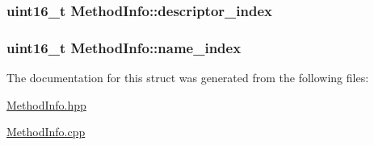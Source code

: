 \subsubsection[{\texorpdfstring{descriptor\+\_\+index}{descriptor_index}}]{\setlength{\rightskip}{0pt plus 5cm}uint16\+\_\+t Method\+Info\+::descriptor\+\_\+index}\hypertarget{struct_method_info_a427ffc223f3b52b4d83fa6ee9e411089}{}\label{struct_method_info_a427ffc223f3b52b4d83fa6ee9e411089}
\subsubsection[{\texorpdfstring{name\+\_\+index}{name_index}}]{\setlength{\rightskip}{0pt plus 5cm}uint16\+\_\+t Method\+Info\+::name\+\_\+index}\hypertarget{struct_method_info_afaa8591bae9244b2b47609e4919e4dbe}{}\label{struct_method_info_afaa8591bae9244b2b47609e4919e4dbe}


The documentation for this struct was generated from the following files\+:\begin{DoxyCompactItemize}
\item 
\hyperlink{_method_info_8hpp}{Method\+Info.\+hpp}\item 
\hyperlink{_method_info_8cpp}{Method\+Info.\+cpp}\end{DoxyCompactItemize}
